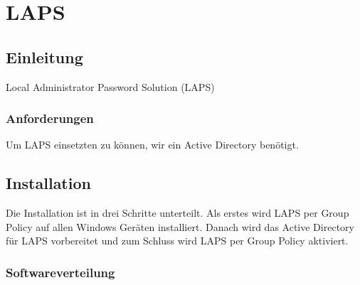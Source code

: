 \chapter{LAPS}
\section{Einleitung}
Local Administrator Password Solution (LAPS)

\subsection{Anforderungen}
Um LAPS einsetzten zu können, wir ein Active Directory benötigt.

\section{Installation}
Die Installation ist in drei Schritte unterteilt.
Als erstes wird LAPS per Group Policy auf allen Windows Geräten installiert.
Danach wird das Active Directory für LAPS vorbereitet und zum Schluss wird LAPS per Group Policy aktiviert.

\subsection{Softwareverteilung}

